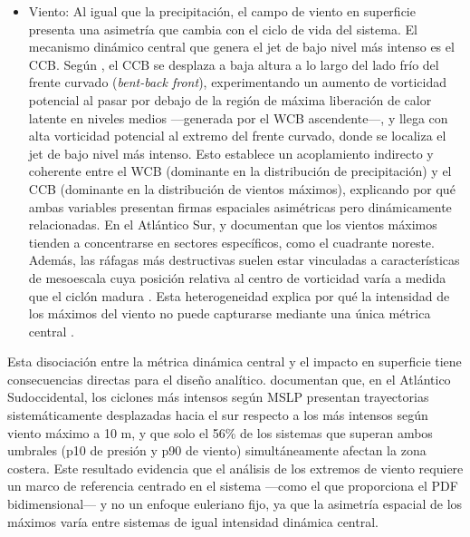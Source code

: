 \begin{itemize}
    \item Viento: Al igual que la precipitación, el campo de viento en superficie presenta una asimetría que cambia con el ciclo de vida del sistema. El mecanismo dinámico central que genera el jet de bajo nivel más intenso es el CCB. Según \citet{schemm2014linkage}, el CCB se desplaza a baja altura a lo largo del lado frío del frente curvado (\textit{bent-back front}), experimentando un aumento de vorticidad potencial al pasar por debajo de la región de máxima liberación de calor latente en niveles medios —generada por el WCB ascendente—, y llega con alta vorticidad potencial al extremo del frente curvado, donde se localiza el jet de bajo nivel más intenso. Esto establece un acoplamiento indirecto y coherente entre el WCB (dominante en la distribución de precipitación) y el CCB (dominante en la distribución de vientos máximos), explicando por qué ambas variables presentan firmas espaciales asimétricas pero dinámicamente relacionadas. En el Atlántico Sur, \citet{bitencourt2010relating} y \citet{cardoso2022synoptic} documentan que los vientos máximos tienden a concentrarse en sectores específicos, como el cuadrante noreste. Además, las ráfagas más destructivas suelen estar vinculadas a características de mesoescala cuya posición relativa al centro de vorticidad varía a medida que el ciclón madura \citep{eisenstein2023identification}. Esta heterogeneidad explica por qué la intensidad de los máximos del viento no puede capturarse mediante una única métrica central \citep{corner2025classification}.

\end{itemize}

Esta disociación entre la métrica dinámica central y el impacto en superficie tiene consecuencias directas para el diseño analítico. \citet{andrade2024composite} documentan que, en el Atlántico Sudoccidental, los ciclones más intensos según MSLP presentan trayectorias sistemáticamente desplazadas hacia el sur respecto a los más intensos según viento máximo a 10 m, y que solo el 56\% de los sistemas que superan ambos umbrales (p10 de presión y p90 de viento) simultáneamente afectan la zona costera. Este resultado evidencia que el análisis de los extremos de viento requiere un marco de referencia centrado en el sistema —como el que proporciona el PDF bidimensional— y no un enfoque euleriano fijo, ya que la asimetría espacial de los máximos varía entre sistemas de igual intensidad dinámica central.

